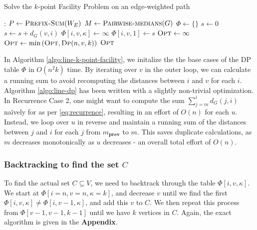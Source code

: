 \documentclass[9pt]{article}
\begin{document}
\vspace*{-12pt}
\begin{algorithm}[H]
    \caption{Solve the $k$-point Facility Problem on an edge-weighted path}
    \label{algo:line-k-point-facility}
    \begin{algorithmic}[1]
        :
            \State $P \gets \textsc{Prefix-Sum}(W_{E})$ 
            \State $M \gets \textsc{Pairwise-medians}(G)$
            \State $\Phi \gets \{ \}$ 
                \State $s \gets 0$
                    \State $s \gets s + d_{G}(v, i)$
                            \State $\Phi[i, v, \kappa] \gets \infty$ 
                        \EndIf
                    \EndFor
                    \State $\Phi[i, v, 1] \gets s$ 
                \EndFor
            \EndFor
            \State $\textsc{Opt} \gets \infty$
                \State $\textsc{Opt} \gets \min \left( \textsc{Opt}, \Call{Dp}{n, v, k} \right)$
            \EndFor
            \State \Return $\textsc{Opt}$
        \EndProcedure
    \end{algorithmic}
\end{algorithm}
\vfill
\pagebreak
\hspace*{-19pt}
In Algorithm \ref{algo:line-k-point-facility}, we initalize the the base cases of the DP table
$\Phi$ in $O(n^{2} k)$ time. By iterating over $v$ in the outer loop, we can calculate a running
sum to avoid recomputing the distances between $i$ and $v$ for each $i$. \\
Algorithm \ref{algo:line-dp} has been written with a slightly non-trivial optimization. In
Recurrence Case 2, one might want to compute the sum $\sum_{j=m}^{i} d_{G}(j, i)$ naïvely for
as per \ref{eq:recurrence}, resulting in an effort of $O(n)$ for each $u$. Instead, we loop
over $u$ in reverse and maintain a running sum of the distances between $j$ and $i$ for each
$j$ from $m_{\textbf{prev}}$ to $m$. This saves duplicate calculations, as $m$ decreases
monotonically as $u$ decreases - an overall total effort of $O(n)$.

\subsubsection*{Backtracking to find the set $C$}
To find the actual set $C \subseteq V$, we need to backtrack through the table $\Phi[i, v, \kappa]$.
We start at $\Phi[i=n, v=n, \kappa=k]$, and decrease $v$ until we find the first
$\Phi[i, v, \kappa] \neq \Phi[i, v-1, \kappa]$, and add this $v$ to $C$. We then repeat this
process from $\Phi[v-1, v-1, k-1]$ until we have $k$ vertices in $C$. Again, the exact algorithm
is given in the \textbf{Appendix}.
\end{document}
